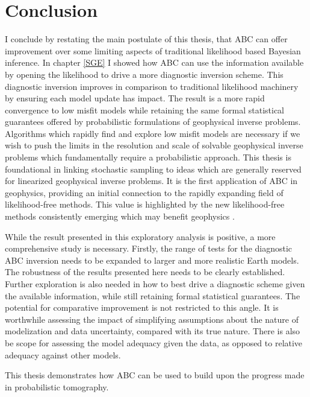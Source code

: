 

\chapter{Conclusion}

I conclude by restating the main postulate of this thesis, that ABC can offer improvement over some limiting aspects of traditional likelihood based Bayesian inference. In chapter \ref{SGE} I showed how ABC can use the information available by opening the likelihood to drive a more diagnostic inversion scheme. This diagnostic inversion improves in comparison to traditional likelihood machinery by ensuring each model update has impact. The result is a more rapid convergence to low misfit models while retaining the same formal statistical guarantees offered by probabilistic formulations of geophysical inverse problems. Algorithms which rapidly find and explore low misfit models are necessary if we wish to push the limits in the resolution and scale of solvable geophysical inverse problems which fundamentally require a probabilistic approach. This thesis is foundational in linking stochastic sampling to ideas which are generally reserved for linearized geophysical inverse problems. It is the first application of ABC in geophysics, providing an initial connection to the rapidly expanding field of likelihood-free methods. This value is highlighted by the new likelihood-free methods consistently emerging which may benefit geophysics \citep{papamakarios2016fast,song2017nice}.\par

While the result presented in this exploratory analysis is positive, a more comprehensive study is necessary. Firstly, the range of tests for the diagnostic ABC inversion needs to be expanded to larger and more realistic Earth models. The robustness of the results presented here needs to be clearly established. Further exploration is also needed in how to best drive a diagnostic scheme given the available information, while still retaining formal statistical guarantees. The potential for comparative improvement is not restricted to this angle. It is worthwhile assessing the impact of simplifying assumptions about the nature of modelization and data uncertainty, compared with its true nature. There is also be scope for assessing the model adequacy given the data, as opposed to relative adequacy against other models. \par
This thesis demonstrates how ABC can be used to build upon the progress made in probabilistic tomography.
